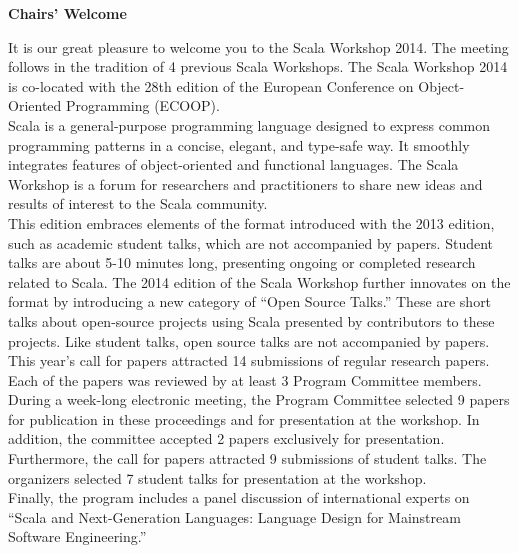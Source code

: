 \documentclass[10pt]{book}
\title{}
\date{}
\begin{document}
\thispagestyle{empty}


{\centering \LARGE \bf Chairs' Welcome\par}

\vspace{0.5cm}
\normalsize

\noindent
It is our great pleasure to welcome you to the Scala Workshop 2014. The
meeting follows in the tradition of 4 previous Scala Workshops. The Scala
Workshop 2014 is co-located with the 28th edition of the European Conference
on Object-Oriented Programming (ECOOP).
\\

\noindent
Scala is a general-purpose programming language designed to express common
programming patterns in a concise, elegant, and type-safe way. It smoothly
integrates features of object-oriented and functional languages. The Scala
Workshop is a forum for researchers and practitioners to share new ideas and
results of interest to the Scala community.
\\

\noindent
This edition embraces elements of the format introduced with the 2013 edition,
such as academic student talks, which are not accompanied by papers. Student
talks are about 5-10 minutes long, presenting ongoing or completed research
related to Scala. The 2014 edition of the Scala Workshop further innovates on
the format by introducing a new category of ``Open Source Talks.'' These are
short talks about open-source projects using Scala presented by contributors
to these projects. Like student talks, open source talks are not accompanied
by papers.
\\

\noindent
This year's call for papers attracted 14 submissions of regular research
papers. Each of the papers was reviewed by at least 3 Program Committee
members. During a week-long electronic meeting, the Program Committee selected
9 papers for publication in these proceedings and for presentation at the
workshop. In addition, the committee accepted 2 papers exclusively for
presentation. Furthermore, the call for papers attracted 9 submissions of
student talks. The organizers selected 7 student talks for presentation at the
workshop.
\\

\noindent
Finally, the program includes a panel discussion of international experts on
``Scala and Next-Generation Languages: Language Design for Mainstream Software
Engineering.''
\\
\end{document}
